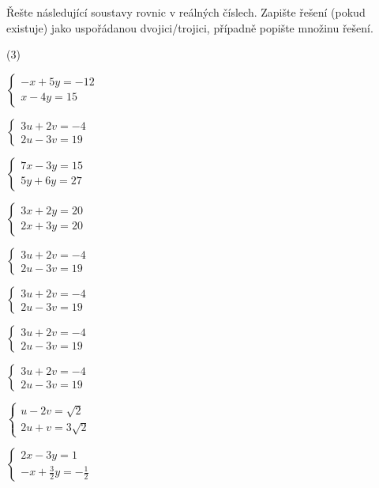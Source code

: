 \documentclass[12pt,a4paper]{article}
\begin{document}
\begin{exercise}
Řešte následující soustavy rovnic v reálných číslech. Zapište řešení (pokud existuje) jako uspořádanou dvojici/trojici, případně popište množinu řešení.
\begin{tasks}(3)

\task $\begin{cases}
-x + 5y = -12\\
x - 4y = 15
\end{cases}$

\task $\begin{cases}
3u + 2v = -4\\
2u - 3v = 19
\end{cases}$

\task $\begin{cases}
7x - 3y = 15\\
5y +6y = 27
\end{cases}$

\task $\begin{cases}
3x + 2y = 20\\
2x + 3y = 20
\end{cases}$

\task $\begin{cases}
3u + 2v = -4\\
2u - 3v = 19
\end{cases}$

\task $\begin{cases}
3u + 2v = -4\\
2u - 3v = 19
\end{cases}$

\task $\begin{cases}
3u + 2v = -4\\
2u - 3v = 19
\end{cases}$

\task $\begin{cases}
3u + 2v = -4\\
2u - 3v = 19
\end{cases}$

\task $\begin{cases}
u - 2v = \sqrt{2}\\
2u + v = 3\sqrt{2}
\end{cases}$

\task $\begin{cases}
2x - 3y = 1\\
-x + \tfrac{3}{2}y = -\tfrac{1}{2}
\end{cases}$


\end{tasks}
\end{exercise}
\end{document}

